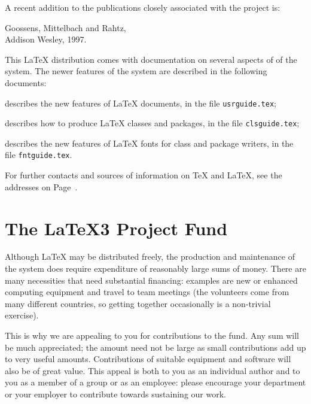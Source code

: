 \documentclass[a4paper]{article}
\newenvironment{citations}{%
   \list{}{%
      \renewcommand{\makelabel}[1]{\normalfont\itshape ##1}%
   }%
}{%
   \endlist
}
\newcommand{\AW}{Addison Wesley}
\begin{document}
A recent addition to the publications closely associated with the
project is:
\begin{citations}
\item[The \LaTeX{} Graphics Companion]
   Goossens, Mittelbach and Rahtz,\\ \AW, 1997.
\end{citations}

This \LaTeX{} distribution comes with documentation on several aspects
of of the system.  The newer features of the system are described in
the following documents:
\begin{citations}
\item[\LaTeXe{} for authors] 
   describes the new features of \LaTeX{} documents,
   in the file \texttt{usrguide.tex};
\item[\LaTeXe{} for class and package writers]
   describes how to produce \LaTeX{} classes and packages,
   in the file \texttt{clsguide.tex};
\item[\LaTeXe{} font selection]
   describes the new features of \LaTeX{} fonts for
   class and package writers,
   in the file \texttt{fntguide.tex}.
\end{citations}

For further contacts and sources of information on \TeX{} and
\LaTeX{}, see the addresses on Page~\pageref{contacts}.

\endgroup
\pagebreak


\section{The \LaTeX3 Project Fund}
\label{fund}

Although \LaTeX{} may be distributed freely, the production and
maintenance of the system does require expenditure of reasonably large
sums of money.  There are many necessities that need substantial
financing: examples are new or enhanced computing equipment and travel
to team meetings (the volunteers come from many different countries,
so getting together occasionally is a non-trivial exercise).
  
This is why we are appealing to you for contributions to the fund.
Any sum will be much appreciated; the amount need not be large as
small contributions add up to very useful amounts.  Contributions of
suitable equipment and software will also be of great value.  This
appeal is both to you as an individual author and to you as a member
of a group or as an employee: please encourage your department or your
employer to contribute towards sustaining our work.
\end{document}
